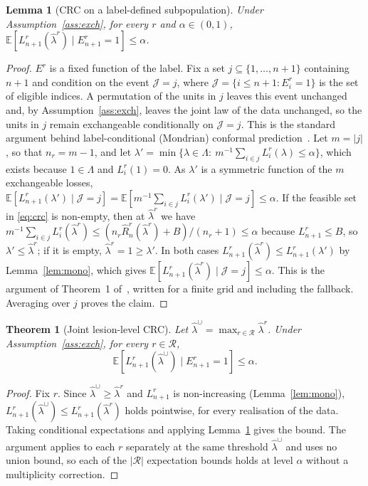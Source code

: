 \documentclass[sn-mathphys-num]{sn-jnl}%
\theoremstyle{thmstyleone}
\newtheorem{theorem}{Theorem}
\newtheorem{lemma}{Lemma}
\theoremstyle{thmstyletwo}
\theoremstyle{thmstylethree}
\newcommand{\E}{\mathbb{E}}
\newcommand{\1}{\mathbb{1}}
\newcommand{\lhat}{\hat\lambda}
\begin{document}
\begin{lemma}[CRC on a label-defined subpopulation]\label{lem:sub}
Under Assumption~\ref{ass:exch}, for every $r$ and $\alpha\in(0,1)$, $\E[L_{n+1}^r(\lhat^r)\mid E_{n+1}^r=1]\le\alpha$.
\end{lemma}
\begin{proof}
$E^r$ is a fixed function of the label. Fix a set $j\subseteq\{1,\dots,n+1\}$ containing $n+1$ and condition on the event $\mathcal J=j$, where $\mathcal J=\{i\le n+1:E^r_i=1\}$ is the set of eligible indices. A permutation of the units in $j$ leaves this event unchanged and, by Assumption~\ref{ass:exch}, leaves the joint law of the data unchanged, so the units in $j$ remain exchangeable conditionally on $\mathcal J=j$. This is the standard argument behind label-conditional (Mondrian) conformal prediction~\cite{angelopoulos2023gentle}. Let $m=|j|$, so that $n_r=m-1$, and let $\lambda'=\min\{\lambda\in\Lambda:\ m^{-1}\sum_{i\in j}L^r_i(\lambda)\le\alpha\}$, which exists because $1\in\Lambda$ and $L_i^r(1)=0$. As $\lambda'$ is a symmetric function of the $m$ exchangeable losses, $\E[L^r_{n+1}(\lambda')\mid\mathcal J=j]=\E[m^{-1}\sum_{i\in j}L^r_i(\lambda')\mid\mathcal J=j]\le\alpha$. If the feasible set in \eqref{eq:crc} is non-empty, then at $\lhat^r$ we have $m^{-1}\sum_{i\in j}L^r_i(\lhat^r)\le(n_r\hat R^r_n(\lhat^r)+B)/(n_r+1)\le\alpha$ because $L^r_{n+1}\le B$, so $\lambda'\le\lhat^r$; if it is empty, $\lhat^r=1\ge\lambda'$. In both cases $L^r_{n+1}(\lhat^r)\le L^r_{n+1}(\lambda')$ by Lemma~\ref{lem:mono}, which gives $\E[L^r_{n+1}(\lhat^r)\mid\mathcal J=j]\le\alpha$. This is the argument of Theorem~1 of~\cite{angelopoulos2024crc}, written for a finite grid and including the fallback. Averaging over $j$ proves the claim.
\end{proof}

\begin{theorem}[Joint lesion-level CRC]\label{thm:joint}
Let $\lhat^\cup=\max_{r\in\mathcal R}\lhat^r$. Under Assumption~\ref{ass:exch}, for every $r\in\mathcal R$,
\[
\E\!\left[L_{n+1}^r(\lhat^\cup)\mid E^r_{n+1}=1\right]\le\alpha .
\]
\end{theorem}
\begin{proof}
Fix $r$. Since $\lhat^\cup\ge\lhat^r$ and $L^r_{n+1}$ is non-increasing (Lemma~\ref{lem:mono}), $L^r_{n+1}(\lhat^\cup)\le L^r_{n+1}(\lhat^r)$ holds pointwise, for every realisation of the data. Taking conditional expectations and applying Lemma~\ref{lem:sub} gives the bound. The argument applies to each $r$ separately at the same threshold $\lhat^\cup$ and uses no union bound, so each of the $|\mathcal R|$ expectation bounds holds at level $\alpha$ without a multiplicity correction.
\end{proof}
\end{document}
